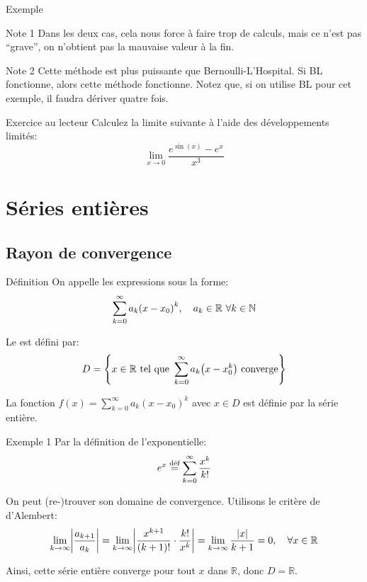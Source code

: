 \documentclass[a4paper]{article}
\begin{document}
\begin{parag}{Exemple}
\begin{subparag}{Note 1}
        Dans les deux cas, cela nous force à faire trop de calculs, mais ce n'est pas ``grave'', on n'obtient pas la mauvaise valeur à la fin.
    \end{subparag}

    \begin{subparag}{Note 2}
        Cette méthode est plus puissante que Bernoulli-L'Hospital. Si BL fonctionne, alors cette méthode fonctionne. Notez que, si on utilise BL pour cet exemple, il faudra dériver quatre fois.
    \end{subparag}
\end{parag}

\begin{parag}{Exercice au lecteur}
    Calculez la limite suivante à l'aide des développements limités:
    \[\lim_{x \to 0} \frac{e^{\sin\left(x\right)} - e^x}{x^3}\]

\end{parag}

\section{Séries entières}
\subsection{Rayon de convergence}
\begin{parag}{Définition}
    On appelle  les expressions sous la forme:
    \[\sum_{k=0}^{\infty} a_k\left(x - x_0\right)^k, \mathspace a_k \in \mathbb{R}\ \forall k \in \mathbb{N}\]

    Le  est défini par:
    \[D = \left\{x \in \mathbb{R} \telque \sum_{k=0}^{\infty} a_k\left(x - x_0^k\right) \text{ converge}\right\}\]

    La fonction $f\left(x\right) = \sum_{k=0}^{\infty} a_k\left(x - x_0\right)^k$ avec $x\in D$ est définie par la série entière.
\end{parag}

\begin{parag}{Exemple 1}
    Par la définition de l'exponentielle:
    \[e^x \over{=}{déf} \sum_{k=0}^{\infty} \frac{x^k}{k!}\]

    On peut (re-)trouver son domaine de convergence. Utilisons le critère de d'Alembert:
    \[\lim_{k \to \infty} \left|\frac{a_{k+1}}{a_k}\right| = \lim_{k \to \infty} \left|\frac{x^{k+1}}{\left(k + 1\right)!} \cdot \frac{k!}{x^k}\right| = \lim_{k \to \infty} \frac{\left|x\right|}{k + 1} = 0, \mathspace \forall x \in \mathbb{R}\]

    Ainsi, cette série entière converge pour tout $x$ dans $\mathbb{R}$, donc $D = \mathbb{R}$.
\end{parag}
\end{document}
